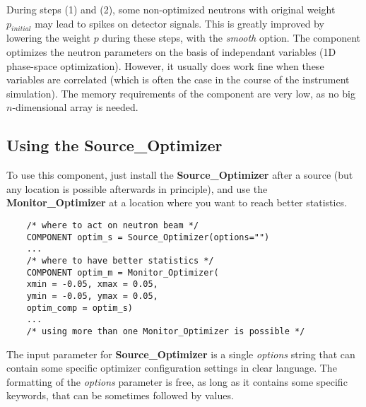 During steps (1) and (2), some non-optimized neutrons with original
weight $p_{initial}$ may lead to spikes on detector signals. This is
greatly improved by lowering the weight $p$ during these steps, with the
\textit{smooth} option.
The component optimizes the neutron parameters on the basis of
independant variables (1D phase-space optimization). However, it usually does work fine when these
variables are correlated (which is often the case in the course of the
instrument simulation).
The memory requirements of the component are very low, as no big
$n$-dimensional array is needed.

\subsection{Using the Source\_Optimizer}

To use this component, just install the \textbf{Source\_Optimizer} after a
source (but any location is possible afterwards in principle), and use the {\bf
  Monitor\_Optimizer} at a location where you want to reach better
statistics.

\begin{lstlisting}
    /* where to act on neutron beam */
    COMPONENT optim_s = Source_Optimizer(options="")
    ...
    /* where to have better statistics */
    COMPONENT optim_m = Monitor_Optimizer(
    xmin = -0.05, xmax = 0.05,
    ymin = -0.05, ymax = 0.05,
    optim_comp = optim_s)
    ...
    /* using more than one Monitor_Optimizer is possible */
\end{lstlisting}

The input parameter for \textbf{Source\_Optimizer} is a single {\it
  options} string that can contain some specific optimizer configuration
settings in clear language. The formatting of the \textit{options}
parameter is free, as long as it contains some specific keywords, that
can be sometimes followed by values.

